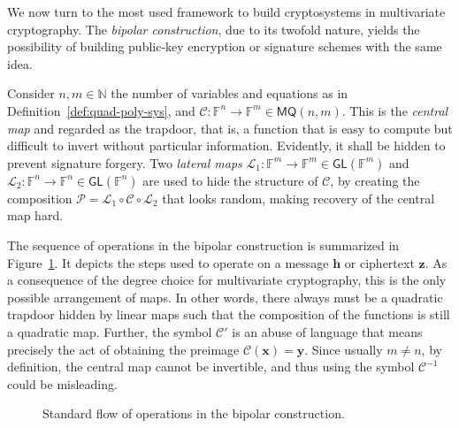 \documentclass[12pt, a4paper, oneside]{memoir}
\theoremstyle{definition}
\begin{document}
We now turn to the most used framework to build cryptosystems in multivariate cryptography. The \emph{bipolar construction}, due to its twofold nature, yields the possibility of building public-key encryption or signature schemes with the same idea.

Consider $n, m \in \mathbb{N}$ the number of variables and equations as in Definition~\ref{def:quad-poly-sys}, and $\mathcal{C} : \mathbb{F}^{n} \to \mathbb{F}^{m} \in \mathsf{MQ}(n, m)$. This is the \emph{central map} and regarded as the trapdoor, that is, a function that is easy to compute but difficult to invert without particular information. Evidently, it shall be hidden to prevent signature forgery. Two \emph{lateral maps} $\mathcal{L}_{1} : \mathbb{F}^{m} \to \mathbb{F}^{m} \in \mathsf{GL}(\mathbb{F}^{m})$ and $\mathcal{L}_{2} : \mathbb{F}^{n} \to \mathbb{F}^{n} \in \mathsf{GL}(\mathbb{F}^{n})$ are used to hide the structure of $\mathcal{C}$, by creating the composition $\mathcal{P} = \mathcal{L}_{1} \circ \mathcal{C} \circ \mathcal{L}_{2}$ that looks random, making recovery of the central map hard.

The sequence of operations in the bipolar construction is summarized in Figure~\ref{fig:bipolar}. It depicts the steps used to operate on a message $\mathbf{h}$ or ciphertext $\mathbf{z}$. As a consequence of the degree choice for multivariate cryptography, this is the only possible arrangement of maps. In other words, there always must be a quadratic trapdoor hidden by linear maps such that the composition of the functions is still a quadratic map. Further, the symbol $\mathcal{C}'$ is an abuse of language that means precisely the act of obtaining the preimage $\mathcal{C}(\mathbf{x}) = \mathbf{y}$. Since usually $m \neq n$, by definition, the central map cannot be invertible, and thus using the symbol $\mathcal{C}^{-1}$ could be misleading.

\begin{figure}[htbp]
  \centering
  \caption{Standard flow of operations in the bipolar
    construction.}\label{fig:bipolar}
\end{figure}
\end{document}

